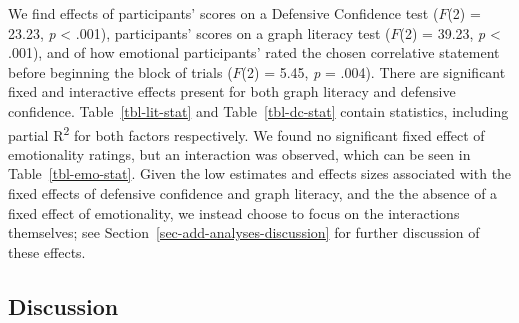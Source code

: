 \documentclass[manuscript,screen,review,anonymous]{acmart}
\begin{document}
\begin{table}

\caption{\label{tbl-emo-stat}Statistics for main effects and
interactions when likert ratings of topic emotionality are included in
the model.}


\end{table}%

We find effects of participants' scores on a Defensive Confidence test
(\(F\)(2) = 23.23, \emph{p} \textless{} .001), participants' scores on a
graph literacy test \citep{garcia_2016} (\(F\)(2) = 39.23, \emph{p}
\textless{} .001), and of how emotional participants' rated the chosen
correlative statement before beginning the block of trials (\(F\)(2) =
5.45, \emph{p} = .004). There are significant fixed and interactive
effects present for both graph literacy and defensive confidence.
Table~\ref{tbl-lit-stat} and Table~\ref{tbl-dc-stat} contain statistics,
including partial R\textsuperscript{2} for both factors respectively. We
found no significant fixed effect of emotionality ratings, but an
interaction was observed, which can be seen in Table~\ref{tbl-emo-stat}.
Given the low estimates and effects sizes associated with the fixed
effects of defensive confidence and graph literacy, and the the absence
of a fixed effect of emotionality, we instead choose to focus on the
interactions themselves; see Section~\ref{sec-add-analyses-discussion}
for further discussion of these effects.

\subsection{Discussion}\label{sec-main-discussion}
\end{document}
